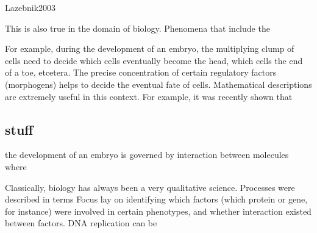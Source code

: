 Lazebnik2003


This is also true in the domain of biology.
%
Phenomena that include the 


For example, during the development of an embryo, the multiplying clump of cells need to decide which cells eventually become the head, which cells the end of a toe, etcetera.
%
The precise concentration of certain regulatory factors (morphogens) helps to decide the eventual fate of cells.
%
Mathematical descriptions are extremely useful in this context.
%
For example, it was recently shown that 





\subsection*{stuff}

 the development of an embryo is governed by interaction between molecules where 


Classically, biology has always been a very qualitative science.
%
Processes were described in terms 
Focus lay on identifying which factors (which protein or gene, for instance) were involved in certain phenotypes, and whether interaction existed between factors.
%
DNA replication can be 





